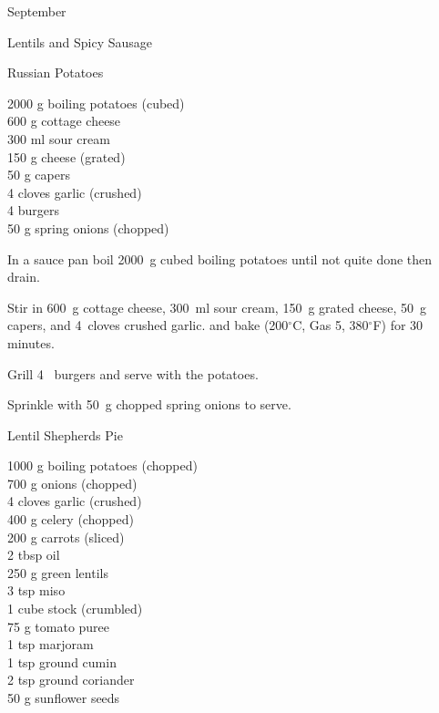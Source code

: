 \begin{menu}{September}
\begin{recipe}{2}{Lentils and Spicy Sausage}
\begin{instructions}
    \end{instructions}
    \end{recipe}%
  
    \begin{recipe}{2}{Russian Potatoes}%
		\begin{ingredients}
		2000 g boiling potatoes (cubed) \\
	600 g cottage cheese  \\
	300 ml sour cream  \\
	150 g cheese (grated) \\
	50 g capers  \\
	4 cloves garlic (crushed) \\
	4  burgers  \\
	50 g spring onions (chopped) \\
	
		\end{ingredients}
	
	
    \begin{instructions}
    \item 
        In a sauce pan boil
        2000~g cubed boiling potatoes
        until not quite done
        then drain.
      \item 
        Stir in
        600~g  cottage cheese,
        300~ml  sour cream,
        150~g grated cheese,
        50~g  capers,
        and
        4~cloves crushed garlic.
        and bake (200$^{\circ}$C, Gas 5, 380$^{\circ}$F) for 30 minutes.
      \item 
        Grill 4~  burgers and serve with the potatoes.
      \item 
        Sprinkle with
        50~g chopped spring onions
        to serve.
      
    \end{instructions}
    \end{recipe}%
  
    \begin{recipe}{2}{Lentil Shepherds Pie}%
		\begin{ingredients}
		1000 g boiling potatoes (chopped) \\
	700 g onions (chopped) \\
	4 cloves garlic (crushed) \\
	400 g celery (chopped) \\
	200 g carrots (sliced) \\
	2 tbsp oil  \\
	250 g green lentils  \\
	3 tsp miso  \\
	1 cube stock (crumbled) \\
	75 g tomato puree  \\
	1 tsp marjoram  \\
	1 tsp ground cumin  \\
	2 tsp ground coriander  \\
	50 g sunflower seeds  \\
	

\end{ingredients}
\end{recipe}
\end{menu}
